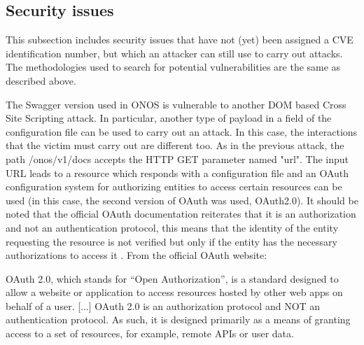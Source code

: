 \subsection{Security issues}
This subsection includes security issues that have not (yet) been assigned a CVE identification number, but which an attacker can still use to carry out attacks. The methodologies used to search for potential vulnerabilities are the same as described above.

The Swagger version used in ONOS is vulnerable to another DOM based Cross Site Scripting attack. In particular, another type of payload in a field of the configuration file can be used to carry out an attack. In this case, the interactions that the victim must carry out are different too. As in the previous attack, the path /onos/v1/docs accepts the HTTP GET parameter named "url". The input URL leads to a resource which responds with a configuration file and an OAuth configuration system for authorizing entities to access certain resources can be used (in this case, the second version of OAuth was used, OAuth2.0). It should be noted that the official OAuth documentation reiterates that it is an authorization and not an authentication protocol, this means that the identity of the entity requesting the resource is not verified but only if the entity has the necessary authorizations to access it \cite{oauth}. From the official OAuth website:
\begin{quoting}[font=itshape, begintext={"}, endtext={"}]
OAuth 2.0, which stands for “Open Authorization”, is a standard designed to allow a website or application to access resources hosted by other web apps on behalf of a user. [...]
OAuth 2.0 is an authorization protocol and NOT an authentication protocol. As such, it is designed primarily as a means of granting access to a set of resources, for example, remote APIs or user data.
\end{quoting}

